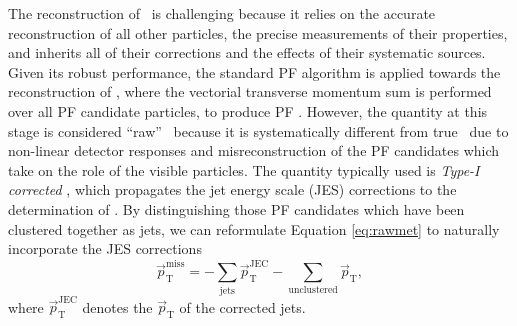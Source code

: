 The reconstruction of \pTmiss\ is challenging because it relies on the accurate reconstruction of all other particles, the precise measurements of their properties, and inherits all of their corrections and the effects of their systematic sources. Given its robust performance, the standard PF algorithm is applied towards the reconstruction of \pTmiss, where the vectorial transverse momentum sum is performed over all PF candidate particles, to produce PF \pTmiss. However, the quantity at this stage is considered ``raw'' \pTmiss\ because it is systematically different from true \pTmiss\ due to non-linear detector responses and misreconstruction of the PF candidates which take on the role of the visible particles. The quantity typically used is \textit{Type-I corrected} \pTmiss, which propagates the jet energy scale (JES) corrections to the determination of \pTmiss. By distinguishing those PF candidates which have been clustered together as jets, we can reformulate Equation \ref{eq:rawmet} to naturally incorporate the JES corrections
\begin{equation}
  \vec{p}_{\mathrm{T}}^{\mathrm{miss}} = - \sum_{\mathrm{jets}} \vec{p}_{\mathrm{T}}^{\mathrm{JEC}} - \sum_{\mathrm{unclustered}} \vec{p}_{\mathrm{T}},
  \label{eq:type1met}
\end{equation}
where $\vec{p}_{\mathrm{T}}^{\mathrm{JEC}}$ denotes the $\vec{p}_{\mathrm{T}}$ of the corrected jets.

